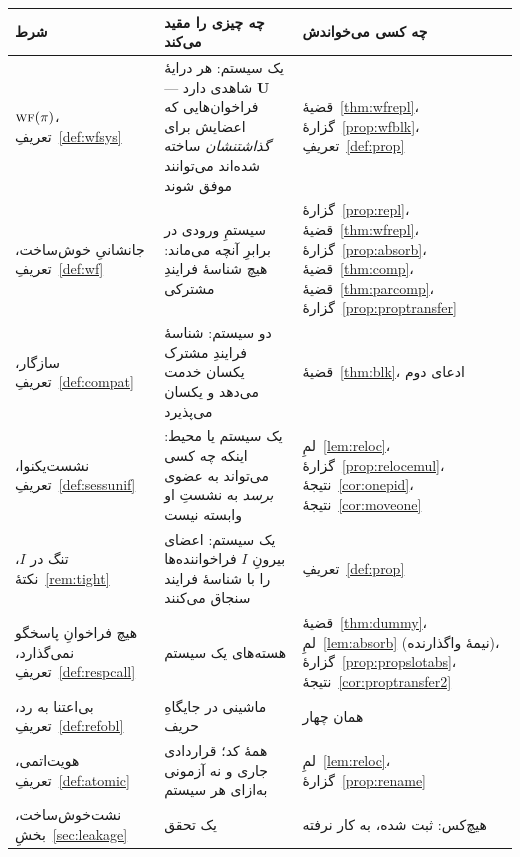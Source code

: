 \documentclass[10pt,oneside,openany]{book}
\newcommand{\uses}{\mathbf{U}}
\newcommand{\WF}{\op{wf}}
\newcommand{\op}[1]{\textnormal{\textsc{#1}}}
\theoremstyle{accentdef}
\theoremstyle{accentplain}
\begin{document}
\begin{center}
\small
\begin{tabular}{@{}>{\raggedright\arraybackslash}p{} >{\raggedright\arraybackslash}p{} >{\raggedright\arraybackslash}p{}@{}}
\toprule
شرط & چه چیزی را مقید می‌کند & چه کسی می‌خواندش \\
\midrule
$\WF(\pi)$، تعریفِ~\ref{def:wfsys}
  & یک سیستم: هر درایهٔ $\uses$ شاهدی دارد --- فراخوان‌هایی که اعضایش برای \emph{گذاشتنشان} ساخته شده‌اند می‌توانند موفق شوند
  & قضیهٔ~\ref{thm:wfrepl}، گزارهٔ~\ref{prop:wfblk}، تعریفِ~\ref{def:prop} \\[0.6ex]
جانشانیِ خوش‌ساخت، تعریفِ~\ref{def:wf}
  & سیستمِ ورودی در برابرِ آنچه می‌ماند: هیچ شناسهٔ فرایندِ مشترکی
  & گزارهٔ~\ref{prop:repl}، قضیهٔ~\ref{thm:wfrepl}، گزارهٔ~\ref{prop:absorb}، قضیهٔ~\ref{thm:comp}، قضیهٔ~\ref{thm:parcomp}، گزارهٔ~\ref{prop:proptransfer} \\[0.6ex]
سازگار، تعریفِ~\ref{def:compat}
  & دو سیستم: شناسهٔ فرایندِ مشترک یکسان خدمت می‌دهد و یکسان می‌پذیرد
  & قضیهٔ~\ref{thm:blk}، ادعای دوم \\[0.6ex]
نشست‌یکنوا، تعریفِ~\ref{def:sessunif}
  & یک سیستم یا محیط: اینکه چه کسی می‌تواند به عضوی \emph{برسد} به نشستِ او وابسته نیست
  & لمِ~\ref{lem:reloc}، گزارهٔ~\ref{prop:relocemul}، نتیجهٔ~\ref{cor:onepid}، نتیجهٔ~\ref{cor:moveone} \\[0.6ex]
تنگ در $I$، نکتهٔ~\ref{rem:tight}
  & یک سیستم: اعضای بیرونِ $I$ فراخواننده‌ها را با شناسهٔ فرایند سنجاق می‌کنند
  & تعریفِ~\ref{def:prop} \\[0.6ex]
هیچ فراخوانِ پاسخگو نمی‌گذارد، تعریفِ~\ref{def:respcall}
  & هسته‌های یک سیستم
  & قضیهٔ~\ref{thm:dummy}، لمِ~\ref{lem:absorb} (نیمهٔ واگذارنده)، گزارهٔ~\ref{prop:propslotabs}، نتیجهٔ~\ref{cor:proptransfer2} \\[0.6ex]
بی‌اعتنا به رد، تعریفِ~\ref{def:refobl}
  & ماشینی در جایگاهِ حریف
  & همان چهار \\[0.6ex]
هویت‌اتمی، تعریفِ~\ref{def:atomic}
  & همهٔ کد؛ قراردادی جاری و نه آزمونی به‌ازای هر سیستم
  & لمِ~\ref{lem:reloc}، گزارهٔ~\ref{prop:rename} \\[0.6ex]
نشت‌خوش‌ساخت، بخشِ~\ref{sec:leakage}
  & یک تحقق
  & هیچ‌کس: ثبت شده، به کار نرفته \\
\bottomrule
\end{tabular}
\end{center}
\end{document}
